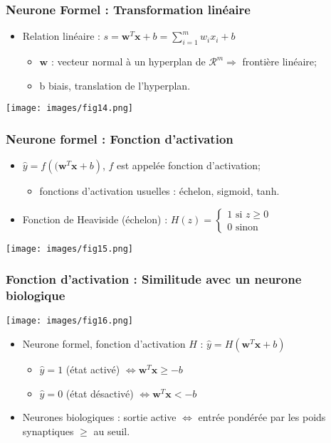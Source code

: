\documentclass[9pt]{beamer}
\newcommand \ve[1]{\mathbf{#1}}
\begin{document}
\begin{frame}
\frametitle{Neurone Formel : Transformation linéaire}
\begin{itemize}
\item Relation linéaire : $s=\ve{w}^T\ve{x}+b = \sum_{i=1}^m w_ix_i+b$
\begin{itemize}
\item $\ve{w}$ : vecteur normal à un hyperplan de $\mathcal{R}^m\Rightarrow$ frontière linéaire;
\item b biais, translation de l'hyperplan.
\end{itemize}
\end{itemize}
\vspace{1cm}
\texttt{[image: images/fig14.png]}
\end{frame}

\begin{frame}
\frametitle{Neurone formel : Fonction d'activation}
\begin{itemize}
\item $\hat{y} = f\left((\ve{w}^T\ve{x}+b\right)$, $f$ est appelée fonction d'activation;
\begin{itemize}
\item fonctions d'activation usuelles : échelon, sigmoid, tanh.
\end{itemize}
\item Fonction de Heaviside (échelon) : 
$
H(z)=
\begin{cases}
1 \text{ si } z\geqslant 0 \\
0 \text{ sinon}
\end{cases}
$
\end{itemize}
\texttt{[image: images/fig15.png]}
\end{frame}

\begin{frame}
\frametitle{Fonction d'activation : Similitude avec un neurone biologique}
\texttt{[image: images/fig16.png]}
\begin{itemize}
\item Neurone formel, fonction d'activation $H$ : $\hat{y}=H\left(\ve{w}^T\ve{x}+b\right)$
\begin{itemize}
\item $\hat{y} = 1$ (état activé) $\Leftrightarrow \ve{w}^T\ve{x}\geqslant -b$
\item $\hat{y} = 0$ (état désactivé) $\Leftrightarrow \ve{w}^T\ve{x}< -b$
\end{itemize}
\item Neurones biologiques : sortie active $\Leftrightarrow$ entrée pondérée par les poids synaptiques $\geqslant$ au seuil.
\end{itemize}
\end{frame}
\end{document}
